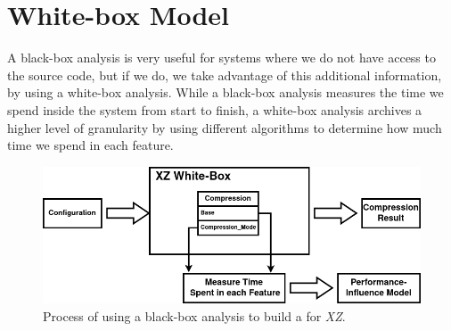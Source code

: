 



\section{White-box Model}\label{ch:Whitebox}

A black-box analysis is very useful for systems where we do not have access to the source code, but if we do, we take advantage of this additional information,
by using a white-box analysis. 
While a black-box analysis measures the time we spend inside the system from start to finish, 
a white-box analysis archives a higher level of granularity by using different algorithms to determine how much time we spend in each feature.

\begin{figure}[h]
    \centering
    \includegraphics[scale=0.55]{gfx/whitebox_2.png}
    \caption{Process of using a black-box analysis to build a {\perfInfluenceModel} for \textit{XZ}.}
    \label{fig:WBxz}
\end{figure}

